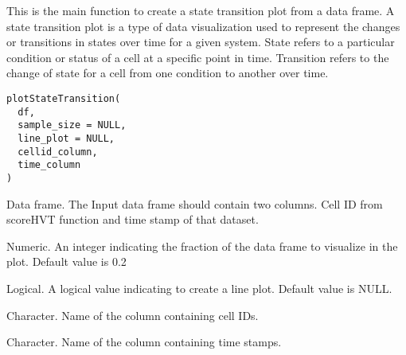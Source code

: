 \documentclass[letterpaper]{book}
\begin{document}
\begin{Examples}
\end{Examples}
%
\begin{Description}
This is the main function to create a state transition plot from a data frame.
A state transition plot is a type of data visualization used to represent 
the changes or transitions in states over time for a given system. 
State refers to a particular condition or status of a cell at a specific point in time. 
Transition refers to the change of state for a cell from one condition to another over time.
\end{Description}
%
\begin{Usage}
\begin{verbatim}
plotStateTransition(
  df,
  sample_size = NULL,
  line_plot = NULL,
  cellid_column,
  time_column
)
\end{verbatim}
\end{Usage}
%
\begin{Arguments}
\begin{ldescription}
\item[\code{df}] Data frame. The Input data frame should contain two columns. 
Cell ID from scoreHVT function and time stamp of that dataset.

\item[\code{sample\_size}] Numeric. An integer indicating the fraction of the data frame to visualize in the plot.
Default value is 0.2

\item[\code{line\_plot}] Logical. A logical value indicating to create a line plot. Default value is NULL.

\item[\code{cellid\_column}] Character. Name of the column containing cell IDs.

\item[\code{time\_column}] Character. Name of the column containing time stamps.
\end{ldescription}
\end{Arguments}
\end{document}
